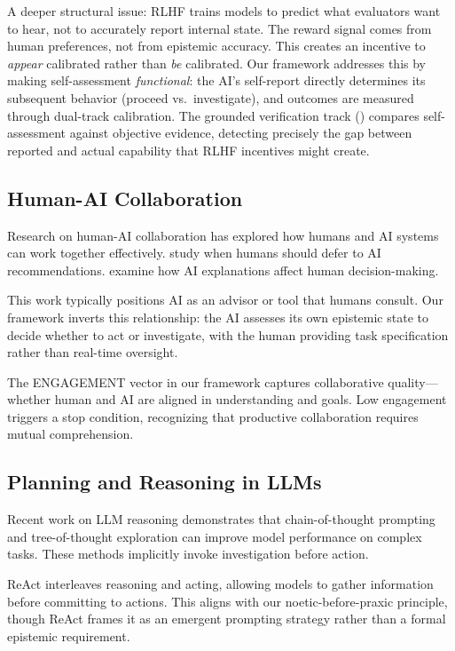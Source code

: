 A deeper structural issue: RLHF trains models to predict what evaluators want to hear, not to accurately report internal state. The reward signal comes from human preferences, not from epistemic accuracy. This creates an incentive to \emph{appear} calibrated rather than \emph{be} calibrated. Our framework addresses this by making self-assessment \emph{functional}: the AI's self-report directly determines its subsequent behavior (proceed vs.\ investigate), and outcomes are measured through dual-track calibration. The grounded verification track () compares self-assessment against objective evidence, detecting precisely the gap between reported and actual capability that RLHF incentives might create.

\subsection{Human-AI Collaboration}

Research on human-AI collaboration has explored how humans and AI systems can work together effectively. \citet{bansal2021does} study when humans should defer to AI recommendations. \citet{lai2021towards} examine how AI explanations affect human decision-making.

This work typically positions AI as an advisor or tool that humans consult. Our framework inverts this relationship: the AI assesses its own epistemic state to decide whether to act or investigate, with the human providing task specification rather than real-time oversight.

The ENGAGEMENT vector in our framework captures collaborative quality---whether human and AI are aligned in understanding and goals. Low engagement triggers a stop condition, recognizing that productive collaboration requires mutual comprehension.

\subsection{Planning and Reasoning in LLMs}

Recent work on LLM reasoning \citep{wei2022chain,yao2023tree} demonstrates that chain-of-thought prompting and tree-of-thought exploration can improve model performance on complex tasks. These methods implicitly invoke investigation before action.

ReAct \citep{yao2023react} interleaves reasoning and acting, allowing models to gather information before committing to actions. This aligns with our noetic-before-praxic principle, though ReAct frames it as an emergent prompting strategy rather than a formal epistemic requirement.


